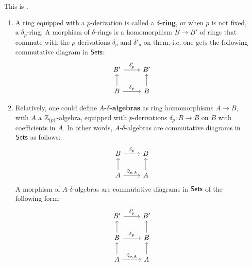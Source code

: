                     \begin{definition} \label{def: delta_rings}
                        This is \cite[Definition 2.1]{bhatt_scholze_prisms}.
                        \begin{enumerate}
                            \item A ring equipped with a $p$-derivation is called a \textbf{$\delta$-ring}, or when $p$ is not fixed, a $\delta_p$-ring. A morphism of $\delta$-rings is a homomorphism $B \to B'$ of rings that commute with the $p$-derivations $\delta_p$ and $\delta'_p$ on them, i.e. one gets the following commutative diagram in $\Sets$:
                                $$
                                    \begin{tikzcd}
                                        B' \arrow[r, "\delta_p'"]         & B'          \\
                                        B \arrow[u] \arrow[r, "\delta_p"] & B \arrow[u]
                                    \end{tikzcd}
                                $$
                            \item Relatively, one could define \textbf{$A$-$\delta$-algebras} as ring homomorphisms $A \to B$, with $A$ a $\Z_{(p)}$-algebra, equipped with $p$-derivations $\delta_p: B \to B$ on $B$ with coefficients in $A$. In other words, $A$-$\delta$-algebras are commutative diagrams in $\Sets$ as follows:
                                $$
                                    \begin{tikzcd}
                                        B \arrow[r, "\delta_p"]               & B           \\
                                        A \arrow[u] \arrow[r, "{\del_{p,A}}"] & A \arrow[u]
                                    \end{tikzcd}
                                $$
                            A morphism of $A$-$\delta$-algebras are commutative diagrams in $\Sets$ of the following form:
                                $$
                                    \begin{tikzcd}
                                        B' \arrow[r, "\delta_p'"]         & B'          \\
                                        B \arrow[u] \arrow[r, "\delta_p"] & B \arrow[u] \\
                                        A \arrow[u] \arrow[r, "\del_{p, A}"]             & A \arrow[u]

\end{tikzcd}$$
\end{enumerate}
\end{definition}
